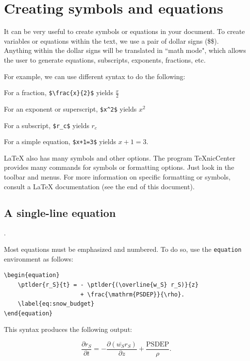 \documentclass[master]{UWMThesis}
\newcommand{\ptlder}[2]{\frac{\partial #1}{\partial #2}}
\begin{document}

\chapter{Creating symbols and equations}  \label{sec:equations}

It can be very useful to create symbols or equations in your document.  To create variables or equations within the text, we use a pair of dollar signs (\$\$).  Anything within the dollar signs will be translated in ``math mode", which allows the user to generate equations, subscripts, exponents, fractions, etc.

For example, we can use different syntax to do the following:

\begin{center}
For a fraction, \verb=$\frac{x}{2}$= yields $\frac{x}{2}$

For an exponent or superscript, \verb=$x^2$= yields $x^2$

For a subscript, \verb=$r_c$= yields $r_c$

For a simple equation, \verb|$x+1=3$| yields $x+1=3$.
\end{center}

LaTeX also has many symbols and other options.  The program TeXnicCenter provides many commands for symbols or formatting options.  Just look in the toolbar and menus.  For more information on specific formatting or symbols, consult a LaTeX documentation (see the end of this document).

\section{A single-line equation}  \label{sec:single_line_eq}.

Most equations must be emphasized and numbered.  To do so, use the \verb=equation= environment as follows:

\pagebreak

\begin{verbatim}
\begin{equation}
    \ptlder{r_S}{t} = - \ptlder{(\overline{w_S} r_S)}{z}
                      + \frac{\mathrm{PSDEP}}{\rho}.
    \label{eq:snow_budget}
\end{equation}
\end{verbatim}

This syntax produces the following output:

\begin{equation}
    \ptlder{r_S}{t} = - \ptlder{(\overline{w_S} r_S)}{z}  + \frac{\mathrm{PSDEP}}{\rho}.
    \label{eq:snow_budget}
\end{equation}
\end{document}

